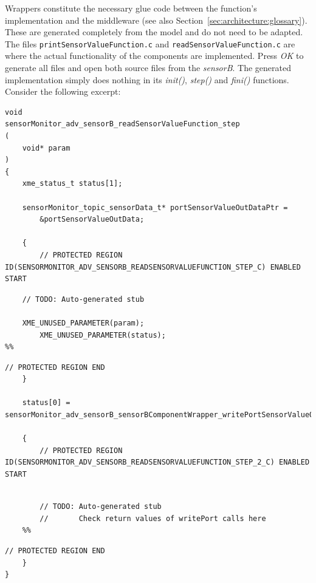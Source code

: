 Wrappers constitute the necessary glue code between the function's implementation and the middleware (see also Section~\ref{sec:architecture:glossary}).
These are generated completely from the model and do not need to be adapted.
The files \verb|printSensorValueFunction.c| and \verb|readSensorValueFunction.c| are where the actual functionality of the components are implemented.
Press \emph{OK} to generate all files and open both source files from the \emph{sensorB}.
The generated implementation simply does nothing in its \emph{init()}, \emph{step()} and \emph{fini()} functions.
%
Consider the following excerpt:
%
\begin{lstlisting}[breaklines]
void
sensorMonitor_adv_sensorB_readSensorValueFunction_step
(
	void* param
)
{
    xme_status_t status[1];
    
    sensorMonitor_topic_sensorData_t* portSensorValueOutDataPtr =
        &portSensorValueOutData;
    
    {
        // PROTECTED REGION ID(SENSORMONITOR_ADV_SENSORB_READSENSORVALUEFUNCTION_STEP_C) ENABLED START
\end{lstlisting}
\vspace{-\baselineskip}
\begin{lstlisting}[breaklines, backgroundcolor=\color{yellow}, escapechar=\%]
%%
	// TODO: Auto-generated stub

	XME_UNUSED_PARAMETER(param);
        XME_UNUSED_PARAMETER(status);
%%
\end{lstlisting}
\vspace{-\baselineskip}
\begin{lstlisting}[breaklines]
	// PROTECTED REGION END
    }
	
    status[0] = sensorMonitor_adv_sensorB_sensorBComponentWrapper_writePortSensorValueOut(portSensorValueOutDataPtr);
    
    {
        // PROTECTED REGION ID(SENSORMONITOR_ADV_SENSORB_READSENSORVALUEFUNCTION_STEP_2_C) ENABLED START
\end{lstlisting}
\vspace{-\baselineskip}
\begin{lstlisting}[breaklines, backgroundcolor=\color{yellow}, escapechar=\%]
    
        // TODO: Auto-generated stub
        //       Check return values of writePort calls here
    %%
\end{lstlisting}
\vspace{-\baselineskip}
\begin{lstlisting}[breaklines]
        // PROTECTED REGION END
    }
}
\end{lstlisting}

